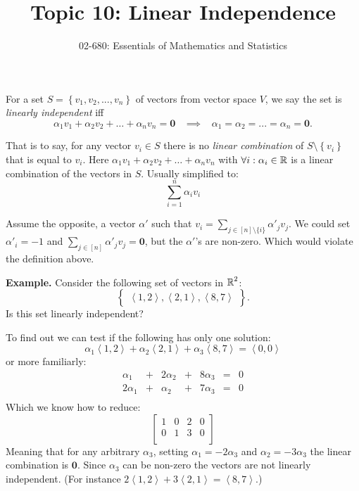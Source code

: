 


\title{Topic 10: Linear Independence}
\author{02-680: Essentials of Mathematics and Statistics}


\maketitle

For a set $S=\left\{v_1,v_2,...,v_n\right\}$ of vectors from vector space $V$, 
we say the set is \emph{linearly independent} iff 
\[
\alpha_1v_1 + \alpha_2v_2 + \hdots + \alpha_nv_n = \mathbf{0} \;\;\;\implies\;\;\; \alpha_1=\alpha_2=...=\alpha_n = \mathbf{0}.
\]

That is to say, for any vector $v_i\in S$ there is no \emph{linear combination} of $S\setminus\left\{v_i\right\}$ that is equal to $v_i$. 
Here $\alpha_1v_1 + \alpha_2v_2 + \hdots + \alpha_nv_n$ with $\forall i: \alpha_i\in\operatorname{\mathbb{R}}$ is a linear combination of the vectors in $S$.
Usually simplified to:  \[\sum_{i=1}^n \alpha_iv_i\]

Assume the opposite, a vector $\alpha'$ such that $v_i = \sum_{j\in [n]\setminus\{i\}}\alpha'_jv_j$. 
We could set $\alpha'_i=-1$
and $\sum_{j\in [n]}\alpha'_jv_j=\mathbf{0}$, but the $\alpha'$'s are non-zero. 
Which would violate the definition above.

\vspace{1em}\textbf{Example.} Consider the following set of vectors in $\operatorname{\mathbb{R}}^2$:
\[\left\{\begin{matrix}
\left\langle1,2\right\rangle,
\left\langle2,1\right\rangle,
\left\langle8,7\right\rangle
\end{matrix}\right\}.\]
Is this set linearly independent? 

To find out we can test if the following has only one solution: 
\[\alpha_1 \left\langle1,2\right\rangle +
\alpha_2 \left\langle2,1\right\rangle +
\alpha_3 \left\langle8,7\right\rangle =
\left\langle0,0\right\rangle\]
or more familiarly: 
\[
\begin{array}{rcrcrcr}
\alpha_1 & + & 2\alpha_2 & + & 8 \alpha_3 & = & 0\\
2\alpha_1 & + & \alpha_2 & + & 7 \alpha_3 & = & 0\\
\end{array}
\]
Which we know how to reduce: 
\[
\left[
\begin{array}{ccc|c}
1 & 0 & 2 & 0\\
0 & 1 & 3 & 0\\
\end{array}
\right]
\]
Meaning that for any arbitrary $\alpha_3$, setting $\alpha_1 = -2\alpha_3$ and $\alpha_2 = -3\alpha_3$ the linear combination is $\mathbf{0}$. 
Since $\alpha_3$ can be non-zero the vectors are not linearly independent. 
(For instance $2 \left\langle1,2\right\rangle +
3 \left\langle2,1\right\rangle=
 \left\langle8,7\right\rangle$.)



